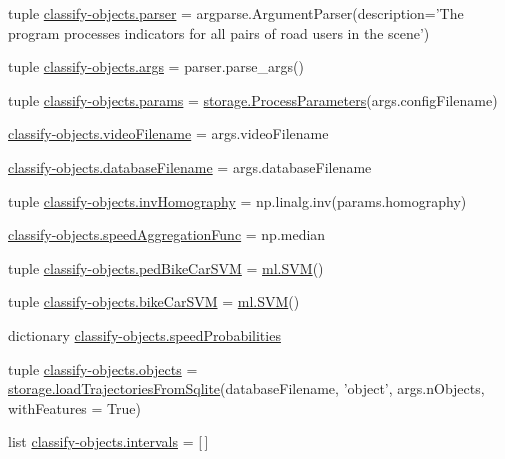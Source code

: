 \begin{DoxyCompactItemize}
\item 
tuple \hyperlink{namespaceclassify-objects_a7b796869625c671d0bd8b25189e0947b}{classify-\/objects.\-parser} = argparse.\-Argument\-Parser(description='The program processes indicators for all pairs of road users in the scene')
\item 
tuple \hyperlink{namespaceclassify-objects_a6b18ad704ee94b3b4e23596aaad7bcf5}{classify-\/objects.\-args} = parser.\-parse\-\_\-args()
\item 
tuple \hyperlink{namespaceclassify-objects_a113b526a5c5fb0c4d8c825cf04475d5e}{classify-\/objects.\-params} = \hyperlink{classstorage_1_1ProcessParameters}{storage.\-Process\-Parameters}(args.\-config\-Filename)
\item 
\hyperlink{namespaceclassify-objects_a3a1d15c4d0d6976121267ea18d8dcc7d}{classify-\/objects.\-video\-Filename} = args.\-video\-Filename
\item 
\hyperlink{namespaceclassify-objects_a702e9e996d554a111f3df585e0027a45}{classify-\/objects.\-database\-Filename} = args.\-database\-Filename
\item 
tuple \hyperlink{namespaceclassify-objects_a1027931e1c6b656a7de2661847cfa267}{classify-\/objects.\-inv\-Homography} = np.\-linalg.\-inv(params.\-homography)
\item 
\hyperlink{namespaceclassify-objects_aa9f837b583e87056a3b9f3fe05bf056c}{classify-\/objects.\-speed\-Aggregation\-Func} = np.\-median
\item 
tuple \hyperlink{namespaceclassify-objects_ad8aa4cfa0495e4475a7a2783ab0cf6a2}{classify-\/objects.\-ped\-Bike\-Car\-S\-V\-M} = \hyperlink{classml_1_1SVM}{ml.\-S\-V\-M}()
\item 
tuple \hyperlink{namespaceclassify-objects_aebb63024c1d7480f628429cc52386d92}{classify-\/objects.\-bike\-Car\-S\-V\-M} = \hyperlink{classml_1_1SVM}{ml.\-S\-V\-M}()
\item 
dictionary \hyperlink{namespaceclassify-objects_a9d78ed6e8e795d4e3df3f3d99f8fbcfd}{classify-\/objects.\-speed\-Probabilities}
\item 
tuple \hyperlink{namespaceclassify-objects_a826dcbf61bf85134c0020343aa29b2b4}{classify-\/objects.\-objects} = \hyperlink{namespacestorage_aaafba9f6bc0816ff0084df5e1d892a9d}{storage.\-load\-Trajectories\-From\-Sqlite}(database\-Filename, 'object', args.\-n\-Objects, with\-Features = True)
\item 
list \hyperlink{namespaceclassify-objects_a3c13bd077bfc0ef3ef064d878d0f32b0}{classify-\/objects.\-intervals} = \mbox{[}$\,$\mbox{]}

\end{DoxyCompactItemize}
